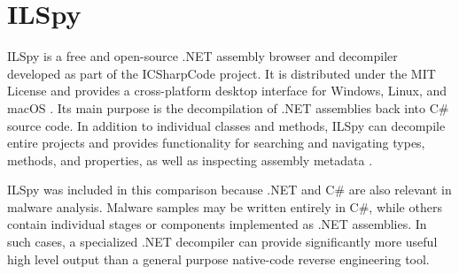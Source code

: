 \section{ILSpy}
\label{sec:tools:ilspy}
ILSpy is a free and open-source .NET assembly browser and decompiler developed as part of the ICSharpCode project. It is distributed under the MIT License and 
provides a cross-platform desktop interface for Windows, Linux, and macOS \cite{bib:ilspy}. Its main purpose is the decompilation of .NET assemblies back into C\# source code. 
In addition to individual classes and methods, ILSpy can decompile entire projects and provides functionality for searching and navigating types, methods, and properties, 
as well as inspecting assembly metadata \cite{bib:ilspy}.

ILSpy was included in this comparison because .NET and C\# are also relevant in malware analysis. Malware samples may be written entirely in C\#, while others contain individual 
stages or components implemented as .NET assemblies. In such cases, a specialized .NET decompiler can provide significantly more useful high level output than a general purpose 
native-code reverse engineering tool.


